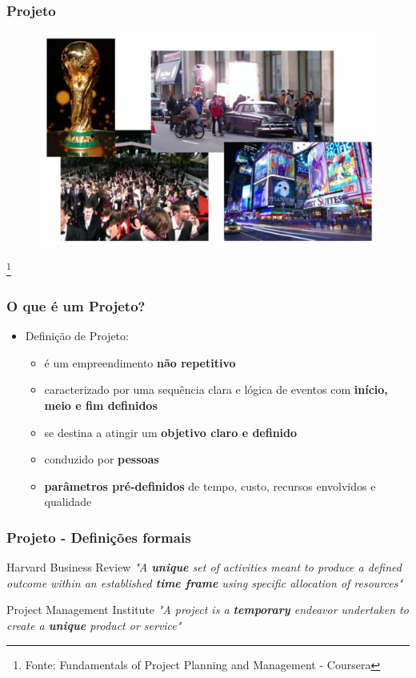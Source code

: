 \begin{frame}
 \frametitle{Projeto}
 \begin{figure}
  \centering
  \includegraphics[width = \textwidth]{figs/fig_proj3.png}
 \end{figure}
\footnote{Fonte: Fundamentals of Project Planning and Management - Coursera}
\end{frame}


\begin{frame}
 \frametitle{O que é um Projeto?}
 \begin{itemize}
  \item Definição de Projeto:
  \begin{itemize}
   \item é um empreendimento \textbf{não repetitivo}
   \item caracterizado por uma sequência clara e lógica de eventos com \textbf{início, meio e fim definidos}
   \item se destina a atingir um \textbf{objetivo claro e definido}
   \item conduzido por \textbf{pessoas}
   \item  \textbf{parâmetros pré-definidos} de tempo, custo, recursos envolvidos e qualidade
  \end{itemize}
 \end{itemize}
\end{frame}

\begin{frame}
 \frametitle{Projeto - Definições formais}
 \begin{block}{Harvard Business Review}
  \textit{"A \textbf{unique} set of activities meant to produce a defined outcome within an established \textbf{time frame} using specific allocation of resources"}	
 \end{block}

 \begin{block}{Project Management Institute}
  \textit{"A project is a \textbf{temporary} endeavor undertaken to create a \textbf{unique} product or service"}
 \end{block}
\end{frame}

